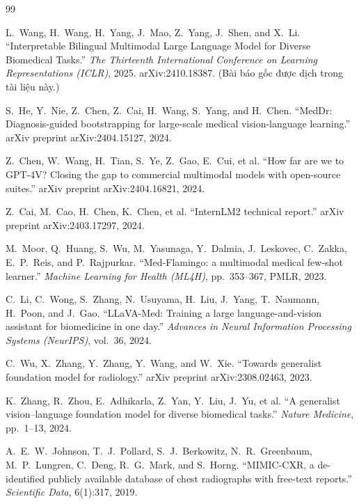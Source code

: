 \documentclass[12pt,a4paper,oneside]{extarticle}
\begin{document}
\renewcommand{\refname}{Tài liệu tham khảo}
\begin{thebibliography}{99}
\small

 L.~Wang, H.~Wang, H.~Yang, J.~Mao, Z.~Yang, J.~Shen, and X.~Li.
``Interpretable Bilingual Multimodal Large Language Model for Diverse Biomedical Tasks.''
\textit{The Thirteenth International Conference on Learning Representations (ICLR)}, 2025.
arXiv:2410.18387. (Bài báo gốc được dịch trong tài liệu này.)

 S.~He, Y.~Nie, Z.~Chen, Z.~Cai, H.~Wang, S.~Yang, and H.~Chen.
``MedDr: Diagnosis-guided bootstrapping for large-scale medical vision-language learning.''
arXiv preprint arXiv:2404.15127, 2024.

 Z.~Chen, W.~Wang, H.~Tian, S.~Ye, Z.~Gao, E.~Cui, et al.
``How far are we to GPT-4V? Closing the gap to commercial multimodal models with open-source
suites.'' arXiv preprint arXiv:2404.16821, 2024.

 Z.~Cai, M.~Cao, H.~Chen, K.~Chen, et al.
``InternLM2 technical report.'' arXiv preprint arXiv:2403.17297, 2024.

 M.~Moor, Q.~Huang, S.~Wu, M.~Yasunaga, Y.~Dalmia, J.~Leskovec, C.~Zakka,
E.~P.~Reis, and P.~Rajpurkar. ``Med-Flamingo: a multimodal medical few-shot learner.''
\textit{Machine Learning for Health (ML4H)}, pp.~353--367, PMLR, 2023.

 C.~Li, C.~Wong, S.~Zhang, N.~Usuyama, H.~Liu, J.~Yang, T.~Naumann, H.~Poon,
and J.~Gao. ``LLaVA-Med: Training a large language-and-vision assistant for biomedicine in one
day.'' \textit{Advances in Neural Information Processing Systems (NeurIPS)}, vol.~36, 2024.

 C.~Wu, X.~Zhang, Y.~Zhang, Y.~Wang, and W.~Xie.
``Towards generalist foundation model for radiology.'' arXiv preprint arXiv:2308.02463, 2023.

 K.~Zhang, R.~Zhou, E.~Adhikarla, Z.~Yan, Y.~Liu, J.~Yu, et al.
``A generalist vision--language foundation model for diverse biomedical tasks.''
\textit{Nature Medicine}, pp.~1--13, 2024.

 A.~E.~W.~Johnson, T.~J.~Pollard, S.~J.~Berkowitz, N.~R.~Greenbaum,
M.~P.~Lungren, C.~Deng, R.~G.~Mark, and S.~Horng. ``MIMIC-CXR, a de-identified publicly available
database of chest radiographs with free-text reports.'' \textit{Scientific Data}, 6(1):317, 2019.


\end{thebibliography}
\end{document}
